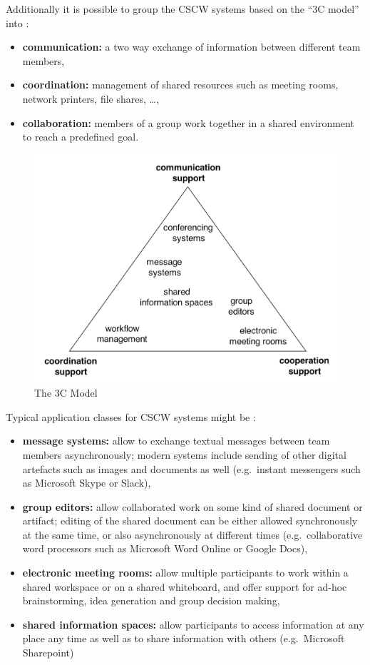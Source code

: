 Additionally it is possible to group the \gls{CSCW} systems based on the ``3C model'' into \citep[pg. 125]{borghoff2000computer}:

\begin{itemize}
  \item \textbf{communication:} a two way exchange of information between different team members,
  \item \textbf{coordination:} management of shared resources such as meeting rooms, network printers, file shares, \ldots,
  \item \textbf{collaboration:} members of a group work together in a shared environment to reach a predefined goal.
\end{itemize}

\begin{figure}[H]
 \centering
 \includegraphics[width=0.9\columnwidth]{images/3C-model.png}
 \caption[The 3C Model]{The 3C Model \citep{Koch2008}}
\label{fig:images_cscw_3C_model}
\end{figure}

Typical application classes for \gls{CSCW} systems might be \citep[pg. 119-120]{borghoff2000computer}: \@

\begin{itemize}
  \item \textbf{message systems:} allow to exchange textual messages between team members asynchronously; modern systems include sending of other digital artefacts such as images and documents as well (e.g.\ instant messengers such as Microsoft Skype or Slack),
  \item \textbf{group editors:} allow collaborated work on some kind of shared document or artifact; editing of the shared document can be either allowed synchronously at the same time, or also asynchronously at different times (e.g.\ collaborative word processors such as Microsoft Word Online or Google Docs),
  \item \textbf{electronic meeting rooms:} allow multiple participants to work within a shared workspace or on a shared whiteboard, and offer support for ad-hoc brainstorming, idea generation and group decision making,
  \item \textbf{shared information spaces:} allow participants to access information at any place any time as well as to share information with others (e.g.\ Microsoft Sharepoint)
\end{itemize}

